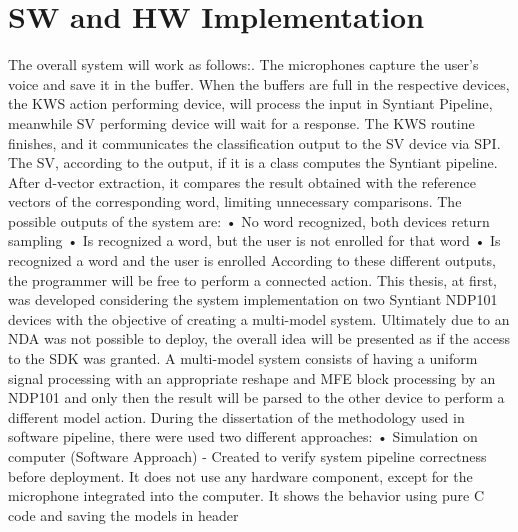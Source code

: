 \chapter{SW and HW Implementation}
\label{cha:software and hardware implementation}
The overall system will work as follows:. The microphones capture the user's voice and save it in the buffer. When the buffers are full in the respective devices, the KWS action performing device, will process the input in Syntiant Pipeline, meanwhile SV performing device will wait for a response. The KWS routine finishes, and it communicates the classification output to the SV device via SPI. The SV, according to the output, if it is a class computes the Syntiant pipeline. After d-vector extraction, it compares the result obtained with the reference vectors of the corresponding word, limiting unnecessary comparisons.\newline\newline
The possible outputs of the system are:\newline
• No word recognized, both devices return sampling\newline
• Is recognized a word, but the user is not enrolled for that word\newline
• Is recognized a word and the user is enrolled\newline
According to these different outputs, the programmer will be free to perform a connected action.\newline
This thesis, at first, was developed considering the system implementation on two Syntiant NDP101 devices with the objective of creating a multi-model system. Ultimately due to an NDA was not possible to deploy, the overall idea will be presented as if the access to the SDK was granted.
A multi-model system consists of having a uniform signal processing with an appropriate reshape and MFE block processing by an NDP101 and only then the result will be parsed to the other device to perform a different model action.
During the dissertation of the methodology used in software pipeline, there were used two different approaches:\newline\newline
• Simulation on computer (Software Approach) - Created to verify system pipeline correctness before deployment. It does not use any hardware component, except for the microphone integrated into the computer. It shows the behavior using pure C code and saving the models in header\newline

